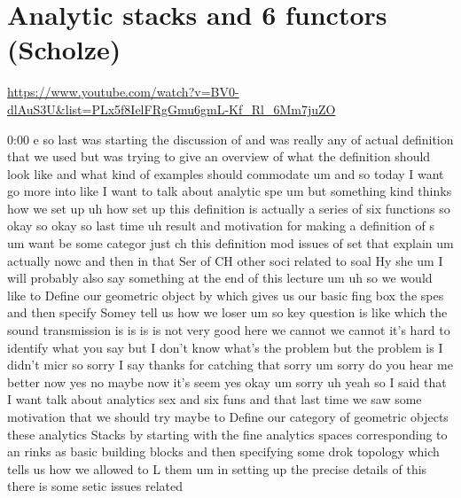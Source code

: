 
\section{\ufs Analytic stacks and 6 functors (Scholze)}

\url{https://www.youtube.com/watch?v=BV0-dlAuS3U&list=PLx5f8IelFRgGmu6gmL-Kf_Rl_6Mm7juZO}
\renewcommand{\yt}[2]{\href{https://www.youtube.com/watch?v=BV0-dlAuS3U&list=PLx5f8IelFRgGmu6gmL-Kf_Rl_6Mm7juZO&t=#1}{#2}}
\vspace{1em}

\begin{unfinished}{0:00}
e
so  last  was  starting  the  discussion  of
and  was  really  any  of  actual  definition
that  we  used  but  was  trying  to  give  an
overview  of  what  the  definition  should
look  like  and  what  kind  of  examples
should  commodate  um  and  so
today  I  want  go  more  into
like  I  want  to  talk  about  analytic
spe  um  but  something  kind  thinks  how  we
set  up  uh  how  set  up  this  definition  is
actually  a  series  of  six  functions
so
okay
so  okay  so  last
time  uh  result  and
motivation  for  making  a  definition  of
s
um  want  be  some  categor  just
ch  this
definition  mod  issues  of  set  that
explain  um  actually
nowc  and  then  in  that  Ser  of  CH  other
soci  related  to  soal  Hy
she
um  I  will  probably  also  say  something  at
the  end  of  this
lecture
um  uh  so  we  would  like  to  Define  our
geometric  object
by  which  gives  us  our  basic  fing  box  the
spes  and  then  specify
Somey  tell  us  how  we  loser  um  so  key
question  is  like
which  the  sound  transmission  is  is  is  is
not  very  good  here  we  cannot  we  cannot
it's  hard  to  identify  what  you  say  but  I
don't  know  what's  the  problem  but  the
problem  is  I  didn't
micr  so  sorry  I  say  thanks  for  catching
that  sorry
um  sorry  do  you  hear  me  better
now  yes  no
maybe  now  it's  seem
yes  okay
um  sorry  uh  yeah  so  I  said  that  I  want
talk  about  analytics  sex  and  six  funs
and  that  last  time  we  saw  some
motivation  that  we  should  try  maybe  to
Define  our  category  of  geometric  objects
these  analytics  Stacks  by  starting  with
the  fine  analytics  spaces  corresponding
to  an  rinks  as  basic  building  blocks  and
then  specifying  some  drok  topology  which
tells  us  how  we  allowed  to  L  them
um  in  setting  up  the  precise  details  of
this  there  is  some  setic  issues  related

\end{unfinished}
